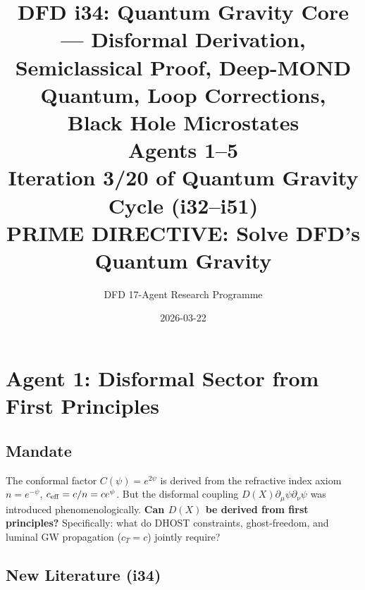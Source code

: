 \documentclass[11pt,a4paper]{article}
\title{DFD i34: Quantum Gravity Core --- Disformal Derivation,\\Semiclassical Proof, Deep-MOND Quantum, Loop Corrections,\\Black Hole Microstates\\[6pt]
\large Agents 1--5\\[6pt]
\normalsize Iteration 3/20 of Quantum Gravity Cycle (i32--i51)\\
PRIME DIRECTIVE: Solve DFD's Quantum Gravity}
\author{DFD 17-Agent Research Programme}
\date{2026-03-22}
\begin{document}
\maketitle
\tableofcontents
\newpage

\section{Agent 1: Disformal Sector from First Principles}
\label{sec:agent1}

\subsection{Mandate}

The conformal factor $C(\psi) = e^{2\psi}$ is derived from the refractive index axiom $n = e^{-\psi}$, $c_{\rm eff} = c/n = ce^{\psi}$. But the disformal coupling $D(X)\partial_\mu\psi\partial_\nu\psi$ was introduced phenomenologically. \textbf{Can $D(X)$ be derived from first principles?} Specifically: what do DHOST constraints, ghost-freedom, and luminal GW propagation ($c_T = c$) jointly require?

\subsection{New Literature (i34)}
\end{document}
